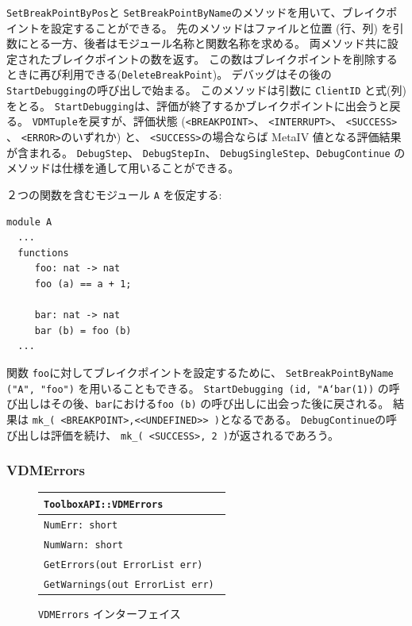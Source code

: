 \documentclass[\pformat,12pt]{jarticle}
\begin{document}
{\tt SetBreakPointByPos}と {\tt SetBreakPointByName}のメソッドを用いて、ブレイクポイントを設定することができる。
先のメソッドはファイルと位置 (行、列) を引数にとる一方、後者はモジュール名称と関数名称を求める。
両メソッド共に設定されたブレイクポイントの数を返す。
この数はブレイクポイントを削除するときに再び利用できる({\tt DeleteBreakPoint})。
デバッグはその後の {\tt StartDebugging}の呼び出しで始まる。
このメソッドは引数に {\tt ClientID} と式(列) をとる。
{\tt StartDebugging}は、評価が終了するかブレイクポイントに出会うと戻る。
 {\tt VDMTuple}を戻すが、評価状態 ({\tt <BREAKPOINT>}、 {\tt <INTERRUPT>}、 {\tt <SUCCESS>} 、 {\tt <ERROR>}のいずれか) と、 {\tt <SUCCESS>}の場合ならば MetaIV 値となる評価結果が含まれる。
 {\tt DebugStep}、 {\tt DebugStepIn}、 {\tt DebugSingleStep}、{\tt DebugContinue} のメソッドは仕様を通して用いることができる。

２つの関数を含むモジュール \texttt{A} を仮定する:

\begin{verbatim}
module A
  ...
  functions
     foo: nat -> nat
     foo (a) == a + 1;

     bar: nat -> nat
     bar (b) = foo (b)
  ...
\end{verbatim}

関数 {\tt foo}に対してブレイクポイントを設定するために、 {\tt SetBreakPointByName ("A", "foo")} を用いることもできる。
{\tt StartDebugging (id, "A`bar(1))} の呼び出しはその後、{\tt bar}における{\tt foo (b)} の呼び出しに出会った後に戻される。
結果は {\tt mk\_( <BREAKPOINT>,<<UNDEFINED>> )}となるである。
 {\tt DebugContinue}の呼び出しは評価を続け、 {\tt mk\_( <SUCCESS>, 2 )}が返されるであろう。

\subsubsection{VDMErrors}
\label{VDMErrors}


\begin{figure}[tbh]
\begin{center}
\begin{tabular}{|l|}
\hline
{\tt ToolboxAPI::VDMErrors } \\
\hline
{\tt NumErr: short } \\
{\tt NumWarn: short } \\
\hline
{\tt GetErrors(out ErrorList err) } \\
{\tt GetWarnings(out ErrorList err) } \\
\hline
\end{tabular}
\caption{{\tt VDMErrors} インターフェイス}\label{fig:VDMErrors}
\end{center}
\end{figure}
\end{document}
